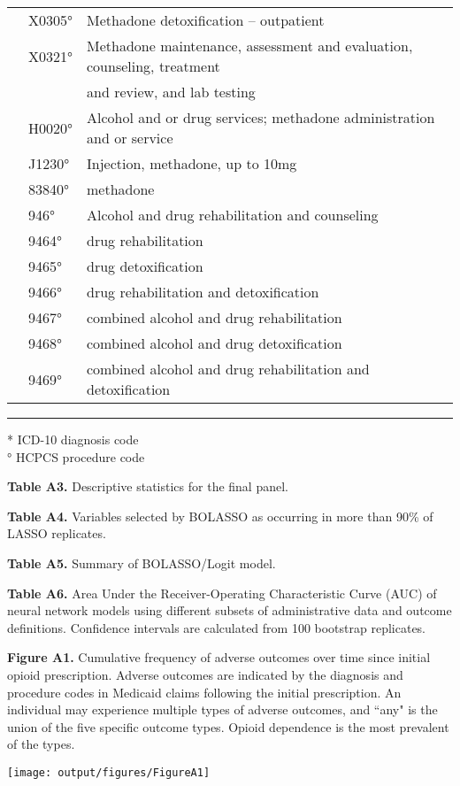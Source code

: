 \documentclass[11pt, letter]{article}
\begin{document}
\begin{tabular}{lll}
 & X0305° & Methadone detoxification – outpatient \\
 & X0321° & Methadone maintenance, assessment and evaluation, counseling, treatment \\
 &  & and review, and lab testing \\
 & H0020° & Alcohol and or drug services; methadone administration and or service \\
 & J1230° & Injection, methadone, up to 10mg \\
 & 83840° & methadone \\
 & 946° & Alcohol and drug rehabilitation and counseling \\
 & 9464° & drug rehabilitation \\
 & 9465° & drug detoxification \\
 & 9466° & drug rehabilitation and detoxification \\
 & 9467° & combined alcohol and drug rehabilitation \\
 & 9468° & combined alcohol and drug detoxification \\
 & 9469° & combined alcohol and drug rehabilitation and detoxification \\[1em]
\end{tabular}

\hrule

\footnotesize
* ICD-10 diagnosis code \\
° HCPCS procedure code
\normalsize

\newpage

\textbf{Table A3.} Descriptive statistics for the final panel.



\newpage

\textbf{Table A4.} Variables selected by BOLASSO as occurring in more than 90\% of LASSO replicates.

\tiny

\normalsize

\newpage

\textbf{Table A5.} Summary of BOLASSO/Logit model.

\tiny

\normalsize

\newpage

\textbf{Table A6.} Area Under the Receiver-Operating Characteristic Curve (AUC) of neural network models using different subsets of administrative data and outcome definitions. Confidence intervals are calculated from 100 bootstrap replicates.

\scriptsize

\normalsize

\newpage

\textbf{Figure A1.} Cumulative frequency of adverse outcomes over time since initial opioid prescription. Adverse outcomes are indicated by the diagnosis and procedure codes in Medicaid claims following the initial prescription. An individual may experience multiple types of adverse outcomes, and ``any" is the union of the five specific outcome types. Opioid dependence is the most prevalent of the types.

\texttt{[image: output/figures/FigureA1]}
\end{document}
